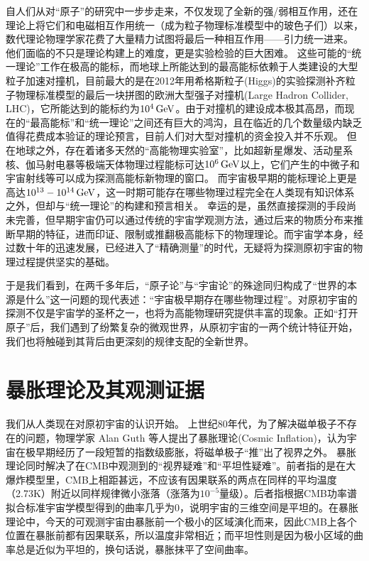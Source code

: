 自人们从对“原子”的研究中一步步走来，不仅发现了全新的强/弱相互作用，还在理论上将它们和电磁相互作用统一（成为粒子物理标准模型中的玻色子们）以来，数代理论物理学家花费了大量精力试图将最后一种相互作用——引力统一进来。
他们面临的不只是理论构建上的难度，更是实验检验的巨大困难。
这些可能的“统一理论”工作在极高的能标，而地球上所能达到的最高能标依赖于人类建设的大型粒子加速对撞机，目前最大的是在2012年用希格斯粒子(Higgs)的实验探测补齐粒子物理标准模型的最后一块拼图的欧洲大型强子对撞机(Large Hadron Collider, LHC)，它所能达到的能标约为$10^4\,{\rm GeV}$。由于对撞机的建设成本极其高昂，而现在的“最高能标”和“统一理论”之间还有巨大的鸿沟，且在临近的几个数量级内缺乏值得花费成本验证的理论预言，目前人们对大型对撞机的资金投入并不乐观。
但在地球之外，存在着诸多天然的“高能物理实验室”，比如超新星爆发、活动星系核、伽马射电暴等极端天体物理过程能标可达$10^6\,{\rm GeV}$以上，它们产生的中微子和宇宙射线等可以成为探测高能标新物理的窗口。
而宇宙极早期的能标理论上更是高达$10^{13}-10^{14}\,{\rm GeV}$，这一时期可能存在哪些物理过程完全在人类现有知识体系之外，但却与“统一理论”的构建和预言相关。
幸运的是，虽然直接探测的手段尚未完善，但早期宇宙仍可以通过传统的宇宙学观测方法，通过后来的物质分布来推断早期的特征，进而印证、限制或推翻极高能标下的物理理论。而宇宙学本身，经过数十年的迅速发展，已经进入了“精确测量”的时代，无疑将为探测原初宇宙的物理过程提供坚实的基础。

于是我们看到，在两千多年后，“原子论”与“宇宙论”的殊途同归构成了“世界的本源是什么”这一问题的现代表述：“宇宙极早期存在哪些物理过程”。对原初宇宙的探测不仅是宇宙学的圣杯之一，也将为高能物理研究提供丰富的现象。正如“打开原子”后，我们遇到了纷繁复杂的微观世界，从原初宇宙的一两个统计特征开始，我们也将触碰到其背后由更深刻的规律支配的全新世界。

\section{暴胀理论及其观测证据}

我们从人类现在对原初宇宙的认识开始。
上世纪80年代，为了解决磁单极子不存在的问题，物理学家 Alan Guth 等人提出了暴胀理论(Cosmic Inflation)，认为宇宙在极早期经历了一段短暂的指数级膨胀，将磁单极子“推”出了视界之外。
暴胀理论同时解决了在CMB中观测到的“视界疑难”和“平坦性疑难”。前者指的是在大爆炸模型里，CMB上相距甚远，不应该有因果联系的两点在同样的平均温度（2.73K）附近以同样规律微小涨落（涨落为$10^{-5}$量级）。后者指根据CMB功率谱拟合标准宇宙学模型得到的曲率几乎为0，说明宇宙的三维空间是平坦的。在暴胀理论中，今天的可观测宇宙由暴胀前一个极小的区域演化而来，因此CMB上各个位置在暴胀前都有因果联系，所以温度非常相近；而平坦性则是因为极小区域的曲率总是近似为平坦的，换句话说，暴胀抹平了空间曲率。


